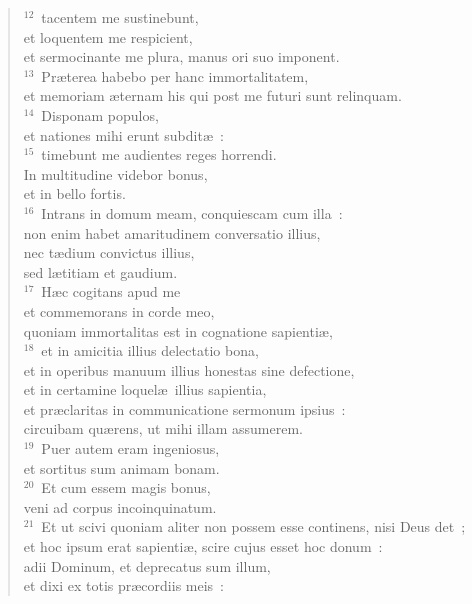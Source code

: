 \begin{verse}
${}^{12}$~tacentem me sustinebunt,\\ et loquentem me respicient,\\ et sermocinante me plura, manus ori suo imponent.\\
${}^{13}$~Pr\ae terea habebo per hanc immortalitatem,\\ et memoriam \ae ternam his qui post me futuri sunt relinquam.\\
${}^{14}$~Disponam populos,\\ et nationes mihi erunt subdit\ae~:\\
${}^{15}$~timebunt me audientes reges horrendi.\\ In multitudine videbor bonus,\\ et in bello fortis.\\
${}^{16}$~Intrans in domum meam, conquiescam cum illa~:\\ non enim habet amaritudinem conversatio illius,\\ nec t\ae dium convictus illius,\\ sed l\ae titiam et gaudium.\\
${}^{17}$~H\ae c cogitans apud me\\ et commemorans in corde meo,\\ quoniam immortalitas est in cognatione sapienti\ae ,\\
${}^{18}$~et in amicitia illius delectatio bona,\\ et in operibus manuum illius honestas sine defectione,\\ et in certamine loquel\ae\ illius sapientia,\\ et pr\ae claritas in communicatione sermonum ipsius~:\\ circuibam qu\ae rens, ut mihi illam assumerem.\\
${}^{19}$~Puer autem eram ingeniosus,\\ et sortitus sum animam bonam.\\
${}^{20}$~Et cum essem magis bonus,\\ veni ad corpus incoinquinatum.\\
${}^{21}$~Et ut scivi quoniam aliter non possem esse continens, nisi Deus det~;\\ et hoc ipsum erat sapienti\ae , scire cujus esset hoc donum~:\\ adii Dominum, et deprecatus sum illum,\\ et dixi ex totis pr\ae cordiis meis~:\end{verse}


